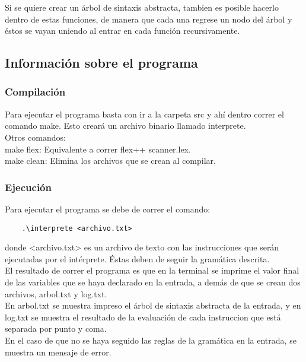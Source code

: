 \documentclass[12pt]{article}
\begin{document}
Si se quiere crear un árbol de sintaxis abstracta, tambien es posible hacerlo dentro de estas funciones, de manera que cada una regrese un nodo del árbol y éstos se vayan uniendo al entrar en cada función recursivamente.

\subsection*{Información sobre el programa}

\subsubsection*{Compilación}
Para ejecutar el programa basta con ir a la carpeta \textsf{src} y ahí dentro correr el comando \textsf{make}. Esto creará un archivo binario llamado \textsf{interprete}. \\

Otros comandos: \\

\textsf{make flex}: Equivalente a correr \textsf{flex++ scanner.lex}. \\
\textsf{make clean}: Elimina los archivos que se crean al compilar.

\subsubsection*{Ejecución}

Para ejecutar el programa se debe de correr el comando:
\begin{verbatim}
    .\interprete <archivo.txt>
\end{verbatim}

donde \textsf{<archivo.txt>} es un archivo de texto con las instrucciones que serán ejecutadas por el intérprete. Éstas deben de seguir la gramática descrita. \\

El resultado de correr el programa es que en la terminal se imprime el valor final de las variables que se haya declarado en la entrada, a demás de que se crean dos archivos, \textsf{arbol.txt} y \textsf{log.txt}. \\

En \textsf{arbol.txt} se muestra impreso el árbol de sintaxis abstracta de la entrada, y en \textsf{log.txt} se muestra el resultado de la evaluación de cada instruccion que está separada por punto y coma. \\

En el caso de que no se haya seguido las reglas de la gramática en la entrada, se muestra un mensaje de error. \\
\end{document}
